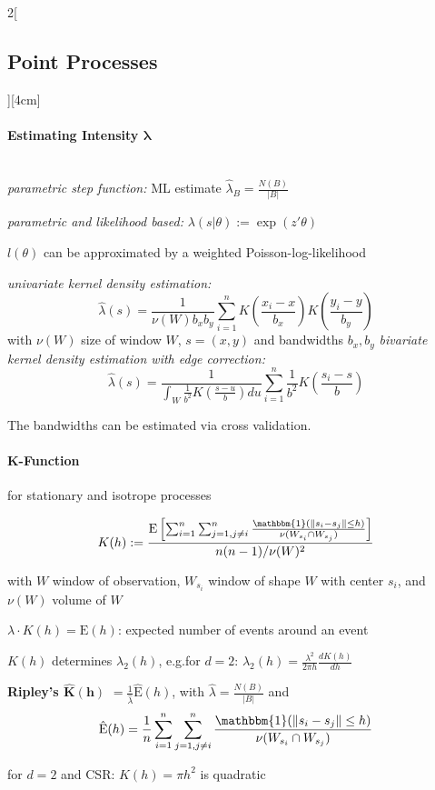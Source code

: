 \documentclass[8pt]{extarticle}
\begin{document}
\begin{multicols}{2}[\subsection{Point Processes}][4cm]
\paragraph{Estimating Intensity $\boldsymbol{\lambda}$} \ \\

\noindent \textit{parametric step function:} ML estimate $\hat{\lambda}_B=\frac{N(B)}{|B|}$

\noindent \textit{parametric and likelihood based:} $\lambda(s|\theta):= \exp(z'\theta)$

\noindent $l(\theta)$ can be approximated by a weighted Poisson-log-likelihood


\noindent \textit{univariate kernel density estimation:}
$$\hat{\lambda}(s)=\frac{1}{\nu(W)b_xb_y}\sum_{i=1}^nK\left(\frac{x_i-x}{b_x}\right)K\left(\frac{y_i-y}{b_y}\right)$$
\noindent with $\nu(W)$ size of window $W$, $s=(x,y)$ and bandwidths $b_x,b_y$
\noindent \textit{bivariate kernel density estimation with edge correction:}
$$\hat{\lambda}(s)=\frac{1}{\int_W \frac{1}{b^2}K\left(\frac{s-u}{b}\right)du}\sum_{i=1}^n\frac{1}{b^2}K\left(\frac{s_i-s}{b}\right)$$

\noindent The bandwidths can be estimated via cross validation.

\paragraph{K-Function} for stationary and isotrope processes %

$$K(h):= \frac{\mathrm{E}\left[\sum_{i=1}^n\sum_{j=1,j\neq i}^n \frac{\mathbbm{1}(\| s_i-s_j\| \leq h)}{\nu(W_{s_i}\cap W_{s_j})}\right]}{n(n-1)/\nu(W)^2}$$

\noindent with $W$ window of observation, $W_{s_i}$ window of shape $W$ with center $s_i$, and $\nu(W)$ volume of $W$

\noindent $\lambda \cdot K(h) = \mathrm{E}(h)$: expected number of events around an event

\noindent $K(h)$ determines $\lambda_2(h)$, e.g.\@ for $d=2$: $\lambda_2(h)=\frac{\lambda^2}{2\pi h} \frac{dK(h)}{dh}$

\vspace{0.3em}
\textbf{Ripley's $\boldsymbol{\hat{K}(h)}$} $=\frac{1}{\hat{\lambda}}\hat{\mathrm{E}}(h)$, with $\hat{\lambda}=\frac{N(B)}{|B|}$ and
$$\hat{\mathrm{E}}(h) = \frac{1}{n}\sum_{i=1}^n\sum_{j=1,j\neq i}^n \frac{\mathbbm{1}(\| s_i-s_j\| \leq h)}{\nu(W_{s_i}\cap W_{s_j})}$$

for $d=2$ and CSR: $K(h)=\pi h^2$ is quadratic


\end{multicols}
\end{document}
